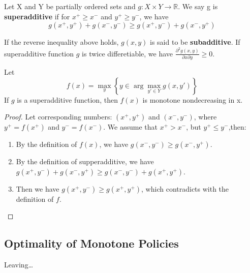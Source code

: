 \begin{definition}
    Let X and Y be partially ordered sets and $ g: X \times Y \rightarrow \mathbb{R}$.
    We say g is \textbf{superadditive} if for $ x^+ \ge x^- $ and $ y^+ \ge y^- $, we have
    \[
        g(x^+, y^+) + g(x^-, y^-) \ge g(x^+, y^-) + g(x^-, y^+)
    \]
\end{definition}
If the reverse inequality above holds, $ g(x, y) $ is said to be \textbf{subadditive}.
If superadditive function $ g $ is twice differetiable, we have $ \frac{\partial^2{g(x,y)}}{\partial{x}\partial{y}} \ge 0$.
\begin{lemma}
    Let
    \[
        f(x) = \max_{y} \left\{ y \in \arg\max_{y' \in Y} g(x, y') \right\}
    \]
    If $ g $ is a superadditive function, then $ f(x) $ is monotone nondecreasing in x.
    \begin{proof}
        Let corresponding numbers: $ (x^+, y^+)$ and $ (x^-, y^-)$, where $ y^+ = f(x^+)$ and $y^- = f(x^-)$.
        We assume that $ x^+ > x^- $, but $ y^+ \le y^- $,then:
        \begin{enumerate}
            \item By the definition of $ f(x) $, we have $ g(x^-, y^-) \ge g(x^-, y^+) $.
            \item By the definition of supperadditive, we have $ g(x^+, y^-) + g(x^-, y^+) \ge g(x^-, y^-) + g(x^+, y^+) $.
            \item Then we have $ g(x^+, y^-) \ge g(x^+, y^+) $, which contradicts with the definition of $ f $.
        \end{enumerate}
    \end{proof}
\end{lemma}

\subsection{Optimality of Monotone Policies}%

Leaving\ldots
